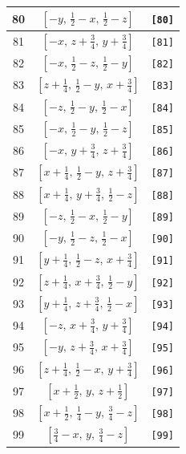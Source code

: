 \documentclass[fleqn,8pt]{jsarticle}
\begin{document}
\begin{longtable}{ccc}
80 & $\left[ - y,\, \frac{1}{2} - x,\, \frac{1}{2} - z \right]$ & {\tt [80]} \\ \hline
81 & $\left[ - x,\, z + \frac{3}{4},\, y + \frac{3}{4} \right]$ & {\tt [81]} \\ \hline
82 & $\left[ - x,\, \frac{1}{2} - z,\, \frac{1}{2} - y \right]$ & {\tt [82]} \\ \hline
83 & $\left[ z + \frac{1}{4},\, \frac{1}{2} - y,\, x + \frac{3}{4} \right]$ & {\tt [83]} \\ \hline
84 & $\left[ - z,\, \frac{1}{2} - y,\, \frac{1}{2} - x \right]$ & {\tt [84]} \\ \hline
85 & $\left[ - x,\, \frac{1}{2} - y,\, \frac{1}{2} - z \right]$ & {\tt [85]} \\ \hline
86 & $\left[ - x,\, y + \frac{3}{4},\, z + \frac{3}{4} \right]$ & {\tt [86]} \\ \hline
87 & $\left[ x + \frac{1}{4},\, \frac{1}{2} - y,\, z + \frac{3}{4} \right]$ & {\tt [87]} \\ \hline
88 & $\left[ x + \frac{1}{4},\, y + \frac{3}{4},\, \frac{1}{2} - z \right]$ & {\tt [88]} \\ \hline
89 & $\left[ - z,\, \frac{1}{2} - x,\, \frac{1}{2} - y \right]$ & {\tt [89]} \\ \hline
90 & $\left[ - y,\, \frac{1}{2} - z,\, \frac{1}{2} - x \right]$ & {\tt [90]} \\ \hline
91 & $\left[ y + \frac{1}{4},\, \frac{1}{2} - z,\, x + \frac{3}{4} \right]$ & {\tt [91]} \\ \hline
92 & $\left[ z + \frac{1}{4},\, x + \frac{3}{4},\, \frac{1}{2} - y \right]$ & {\tt [92]} \\ \hline
93 & $\left[ y + \frac{1}{4},\, z + \frac{3}{4},\, \frac{1}{2} - x \right]$ & {\tt [93]} \\ \hline
94 & $\left[ - z,\, x + \frac{3}{4},\, y + \frac{3}{4} \right]$ & {\tt [94]} \\ \hline
95 & $\left[ - y,\, z + \frac{3}{4},\, x + \frac{3}{4} \right]$ & {\tt [95]} \\ \hline
96 & $\left[ z + \frac{1}{4},\, \frac{1}{2} - x,\, y + \frac{3}{4} \right]$ & {\tt [96]} \\ \hline
97 & $\left[ x + \frac{1}{2},\, y,\, z + \frac{1}{2} \right]$ & {\tt [97]} \\ \hline
98 & $\left[ x + \frac{1}{2},\, \frac{1}{4} - y,\, \frac{3}{4} - z \right]$ & {\tt [98]} \\ \hline
99 & $\left[ \frac{3}{4} - x,\, y,\, \frac{3}{4} - z \right]$ & {\tt [99]} \\ \hline

\end{longtable}
\end{document}
